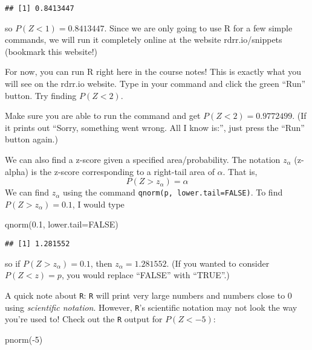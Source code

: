 \documentclass[
]{book}
\newenvironment{Shaded}{\begin{snugshade}}{\end{snugshade}}
\newcommand{\AttributeTok}[1]{\textcolor[rgb]{0.77,0.63,0.00}{#1}}
\newcommand{\ConstantTok}[1]{\textcolor[rgb]{0.00,0.00,0.00}{#1}}
\newcommand{\DecValTok}[1]{\textcolor[rgb]{0.00,0.00,0.81}{#1}}
\newcommand{\FloatTok}[1]{\textcolor[rgb]{0.00,0.00,0.81}{#1}}
\newcommand{\FunctionTok}[1]{\textcolor[rgb]{0.00,0.00,0.00}{#1}}
\newcommand{\NormalTok}[1]{#1}
\newcommand{\SpecialCharTok}[1]{\textcolor[rgb]{0.00,0.00,0.00}{#1}}
\begin{document}
\begin{verbatim}
## [1] 0.8413447
\end{verbatim}

so \(P(Z < 1) = 0.8413447\). Since we are only going to use R for a few simple commands, we will run it completely online at the website rdrr.io/snippets (bookmark this website!)

For now, you can run R right here in the course notes! This is exactly what you will see on the rdrr.io website. Type in your command and click the green ``Run'' button. Try finding \(P(Z < 2)\).

Make sure you are able to run the command and get \(P(Z<2)=0.9772499\). (If it prints out ``Sorry, something went wrong. All I know is:'', just press the ``Run'' button again.)

We can also find a z-score given a specified area/probability. The notation \(z_{\alpha}\) (z-alpha) is the z-score corresponding to a right-tail area of \(\alpha\). That is, \[P(Z>z_{\alpha}) = \alpha\] We can find \(z_{\alpha}\) using the command \texttt{qnorm(p,\ lower.tail=FALSE)}. To find \(P(Z>z_{\alpha}) = 0.1\), I would type

\begin{Shaded}
\begin{Highlighting}[]
\FunctionTok{qnorm}\NormalTok{(}\FloatTok{0.1}\NormalTok{, }\AttributeTok{lower.tail=}\ConstantTok{FALSE}\NormalTok{)}
\end{Highlighting}
\end{Shaded}

\begin{verbatim}
## [1] 1.281552
\end{verbatim}

so if \(P(Z>z_{\alpha}) = 0.1\), then \(z_{\alpha}=1.281552\). (If you wanted to consider \(P(Z < z) = p\), you would replace ``FALSE'' with ``TRUE''.)

A quick note about \texttt{R}: \texttt{R} will print very large numbers and numbers close to 0 using \emph{scientific notation}. However, \texttt{R}'s scientific notation may not look the way you're used to! Check out the \texttt{R} output for \(P(Z < -5)\):

\begin{Shaded}
\begin{Highlighting}[]
\FunctionTok{pnorm}\NormalTok{(}\SpecialCharTok{{-}}\DecValTok{5}\NormalTok{)}
\end{Highlighting}
\end{Shaded}
\end{document}
